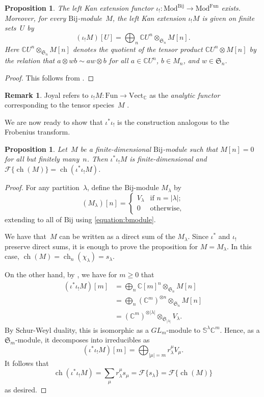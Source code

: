 \documentclass[11pt]{article}
\newtheorem{prop}[theo]{Proposition}
\theoremstyle{definition}
\newtheorem{rema}[theo]{Remark}
\numberwithin{equation}{section}
\newcommand{\K}{\mathbb{C}}
\newcommand{\Vect}{\text{Vect}}
\newcommand{\Mod}{\mathrm{Mod}}
\newcommand{\rmBij}{\mathrm{Bij}}
\newcommand{\rmFun}{\mathrm{Fun}}
\newcommand{\F}[1]{\mathscr{F}\{#1\}}
\newcommand{\Sym}{\mathfrak{S}}
\DeclareMathOperator{\ch}{ch}
\begin{document}
\begin{prop}\label{proposition:leftkanextension}
    The left Kan extension functor $\iota_! \colon \Mod^\rmBij \to \Mod^\rmFun$ exists. Moreover, for every $\rmBij$-module~$M$, the left Kan extension $\iota_! M$ is given on finite sets~$U$ by \[(\iota_! M)[U] = \bigoplus_{n} \K U^n \otimes_{\Sym_n} M[n].\] Here $\K U^n \otimes_{\Sym_n} M[n]$ denotes the quotient of the tensor product $\K U^n \otimes M[n]$ by the relation that $a \otimes w b \sim aw \otimes b$ for all $a \in \K U^n$, $b \in M_n$, and $w \in \Sym_n$.
\end{prop}
\begin{proof}
    This follows from \cite[Proposition~2.6.7]{MR3641124}.
\end{proof}
\begin{rema}
    Joyal refers to $\iota_! M \colon \rmFun \to \Vect_\K$ as the \emph{analytic functor} corresponding to the tensor species~$M$ \cite[Definition~4.2]{MR0927763}.
\end{rema}
We are now ready to show that $\iota^* \iota_!$ is the construction analogous to the Frobenius transform. 
\begin{prop}\label{proposition:kanfrobenius}
    Let~$M$ be a finite-dimensional $\rmBij$-module such that $M[n] = 0$ for all but finitely many~$n$. Then $\iota^*\iota_! M$ is finite-dimensional and $\F{\ch(M)} = \ch(\iota^*\iota_! M)$.
\end{prop}
\begin{proof}
    For any partition~$\lambda$, define the $\rmBij$-module $M_\lambda$ by \[(M_\lambda)[n] = \begin{cases}
        V_\lambda & \mbox{if $n = |\lambda|$;}\\
        0 & \mbox{otherwise,}
    \end{cases}\] extending to all of $\rmBij$ using \eqref{equation:bmodule}.
    
    We have that~$M$ can be written as a direct sum of the $M_\lambda$. Since $\iota^*$ and $\iota_!$ preserve direct sums, it is enough to prove the proposition for $M = M_\lambda$. In this case, $\ch(M) = \ch_n(\chi_\lambda) = s_\lambda$.

    On the other hand, by , we have for $m \geq 0$ that 
    \begin{align*}
        (\iota^*\iota_! M)[m] &= \bigoplus_{n} \K [m]^n \otimes_{\Sym_n} M[n] \\
        &= \bigoplus_{n} (\K^m)^{\otimes n} \otimes_{\Sym_n} M[n] \\
        &= (\K^m)^{\otimes |\lambda|} \otimes_{\Sym_{|\lambda|}} V_\lambda.
    \end{align*}
    By Schur-Weyl duality, this is isomorphic as a $GL_m$-module to $\mathbb{S}^\lambda \K^m$. Hence, as a $\Sym_m$-module, it decomposes into irreducibles as
    \[(\iota^* \iota_! M)[m] = \bigoplus_{|\mu| = m} r^\mu_\lambda V_\mu.\] It follows that \[\ch(\iota^* \iota_! M) = \sum_{\mu} r^{\mu}_\lambda s_\mu = \F{s_\lambda} = \F{\ch(M)}\] as desired.
\end{proof}
\end{document}
